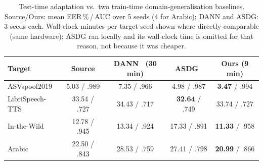 \documentclass[conference]{IEEEtran}
\begin{document}
\begin{table}[t]
\centering
\caption{Test-time adaptation vs.\ two train-time domain-generalisation
baselines. Source/Ours: mean EER\,\%\,/\,AUC over 5 seeds (4 for Arabic); DANN
and ASDG: 3 seeds each. Wall-clock minutes per target-seed shown where directly
comparable (same hardware); ASDG ran locally and its wall-clock time is omitted
for that reason, not because it was cheaper.}
\label{tab:dann}
\begin{tabular}{@{}lcccc@{}}
\toprule
Target & Source & DANN~\cite{dann} (30 min) & ASDG~\cite{asdg} & Ours (9 min) \\
\midrule
ASVspoof2019 & 5.03 / .989 & 7.35 / .966 & 4.98 / .987 & \textbf{3.47} / .994 \\
LibriSpeech-TTS & 33.54 / .727 & 34.43 / .717 & \textbf{32.64} / .749 & 33.74 / .727 \\
In-the-Wild & 12.78 / .945 & 13.34 / .924 & 17.33 / .891 & \textbf{11.33} / .958 \\
Arabic & 22.50 / .843 & 28.53 / .759 & 27.41 / .798 & \textbf{20.99} / .866 \\
\bottomrule
\end{tabular}
\end{table}
\end{document}
